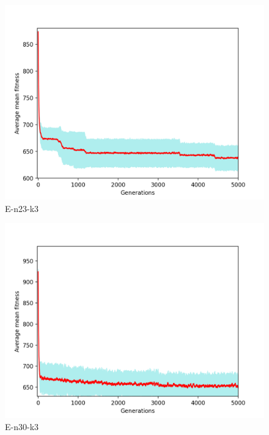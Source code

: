 \documentclass[conference,compsoc]{IEEEtran}
\begin{document}
\begin{figure}[h!]
    \centering
    \includegraphics[scale=0.35]{E-n23-k3-mean}
    \caption{E-n23-k3}
    \label{fig:my_label}
\end{figure}

\begin{figure}[h!]
    \centering
    \includegraphics[scale=0.35]{E-n30-k3-mean}
    \caption{E-n30-k3}
    \label{fig:my_label}
\end{figure}
\end{document}
